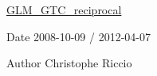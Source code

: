 \hyperlink{group__gtc__reciprocal}{G\-L\-M\-\_\-\-G\-T\-C\-\_\-reciprocal}

\begin{DoxyDate}{Date}
2008-\/10-\/09 / 2012-\/04-\/07 
\end{DoxyDate}
\begin{DoxyAuthor}{Author}
Christophe Riccio 
\end{DoxyAuthor}
